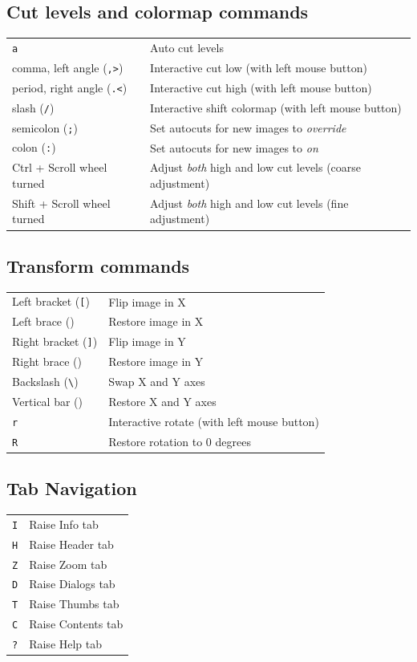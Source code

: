 \documentclass[11pt]{report}
\begin{document}
\subsection{Cut levels and colormap commands}
\begin{tabularx}{\textwidth}{lX}
{\tt a} & Auto cut levels \\
comma, left angle ({\tt ,\textgreater{}}) & Interactive cut low (with left mouse button) \\ 
period, right angle ({\tt .\textless{}}) & Interactive cut high (with left mouse
button) \\ 
slash ({\tt /}) & Interactive shift colormap (with left mouse button) \\
semicolon ({\tt ;}) & Set autocuts for new images to {\em override} \\
colon ({\tt :}) & Set autocuts for new images to {\em on} \\
Ctrl + Scroll wheel turned & Adjust \emph{both} high and low cut levels
(coarse adjustment) \\
Shift + Scroll wheel turned & Adjust \emph{both} high and low cut levels
(fine adjustment) \\
\end{tabularx}

\subsection{Transform commands}
\begin{tabularx}{\textwidth}{lX}
Left bracket ({\tt [}) & Flip image in X \\
Left brace ({\tt \textbraceleft{}}) & Restore image in X \\
Right bracket ({\tt ]}) & Flip image in Y \\
Right brace ({\tt \textbraceright{}}) & Restore image in Y \\
Backslash ({\tt \textbackslash{}}) & Swap X and Y axes \\
Vertical bar ({\tt \textbar{}}) & Restore X and Y axes \\
{\tt r} & Interactive rotate (with left mouse button) \\
{\tt R} & Restore rotation to 0 degrees \\
\end{tabularx}

\subsection{Tab Navigation}
\begin{tabularx}{\textwidth}{lX}
{\tt I} & Raise Info tab \\
{\tt H} & Raise Header tab \\
{\tt Z} & Raise Zoom tab \\
{\tt D} & Raise Dialogs tab \\
{\tt T} & Raise Thumbs tab \\
{\tt C} & Raise Contents tab \\
{\tt ?} & Raise Help tab \\
\end{tabularx}
\end{document}
